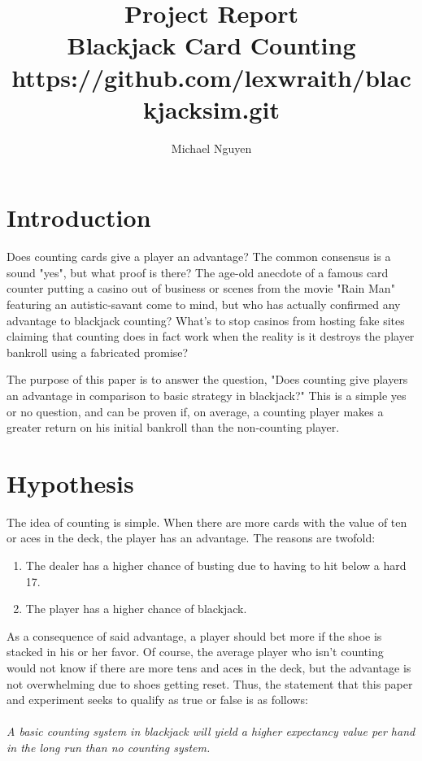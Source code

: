 \documentclass[11pt,letterpaper]{article}
\title{Project Report
\\\normalsize{Blackjack Card Counting}
\\{https://github.com/lexwraith/blackjacksim.git}}
\author{Michael Nguyen}
\begin{document}
\maketitle

\part{Introduction}
\indent \indent Does counting cards give a player an advantage? The common consensus is a sound "yes", but what proof is there? The age-old anecdote of a famous card counter putting a casino out of business or scenes from the movie "Rain Man" featuring an autistic-savant come to mind, but who has actually confirmed any advantage to blackjack counting? What's to stop casinos from hosting fake sites claiming that counting does in fact work when the reality is it destroys the player bankroll using a fabricated promise? 

\indent The purpose of this paper is to answer the question, "Does counting give players an advantage in comparison to basic strategy in blackjack?" This is a simple yes or no question, and can be proven if, on average, a counting player makes a greater return on his initial bankroll than the non-counting player.

\part{Hypothesis}
\indent \indent The idea of counting is simple. When there are more cards with the value of ten or aces in the deck, the player has an advantage. The reasons are twofold:

\begin{enumerate}
\item The dealer has a higher chance of busting due to having to hit below a hard 17.
\item The player has a higher chance of blackjack.
\end{enumerate}

As a consequence of said advantage, a player should bet more if the shoe is stacked in his or her favor. Of course, the average player who isn't counting would not know if there are more tens and aces in the deck, but the advantage is not overwhelming due to shoes getting reset. Thus, the statement that this paper and experiment seeks to qualify as true or false is as follows:
\\\\
\emph{A basic counting system in blackjack will yield a higher expectancy value per hand in the long run than no counting system.}
\end{document}
